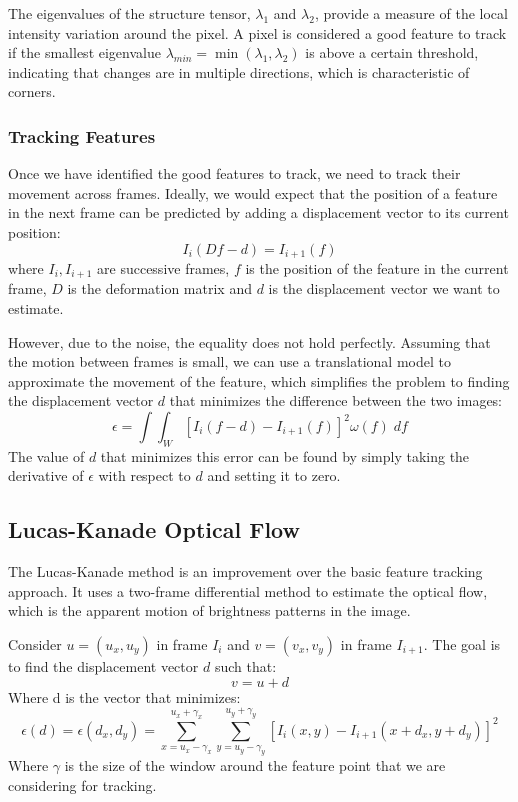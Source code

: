 The eigenvalues of the structure tensor, $\lambda_1$ and $\lambda_2$, provide a measure of the local intensity variation around the pixel.
A pixel is considered a good feature to track if the smallest eigenvalue $\lambda_{min} = \min(\lambda_1, \lambda_2)$ is above a certain threshold, 
indicating that changes are in multiple directions, which is characteristic of corners.

\subsubsection{Tracking Features}
Once we have identified the good features to track, we need to track their movement across frames.
Ideally, we would expect that the position of a feature in the next frame can be predicted by adding a displacement vector to its current position:
$$I_i(Df - d) = I_{i+1}(f)$$
where $I_i, I_{i+1}$ are successive frames, $f$ is the position of the feature in the current frame, $D$ is the deformation matrix 
and $d$ is the displacement vector we want to estimate.

However, due to the noise, the equality does not hold perfectly. Assuming that the motion between frames is small, 
we can use a translational model to approximate the movement of the feature, which simplifies the problem to 
finding the displacement vector $d$ that minimizes the difference between the two images:
$$\epsilon = \int \int_{W} [I_i(f - d) -  I_{i+1}(f)]^2 \omega(f) \; df$$
The value of $d$ that minimizes this error can be found by simply taking the derivative of $\epsilon$ with respect to $d$ and setting it to zero.

\subsection{Lucas-Kanade Optical Flow}
The Lucas-Kanade method is an improvement over the basic feature tracking approach.
It uses a two-frame differential method to estimate the optical flow, which is the apparent motion of brightness patterns in the image.

Consider $u = (u_x, u_y)$ in frame $I_i$ and $v = (v_x, v_y)$ in frame $I_{i+1}$. The goal is to find the displacement vector $d$ such that:
$$v = u + d$$
Where d is the vector that minimizes:
$$\epsilon(d) = \epsilon(d_x, d_y) = \sum_{x = u_x - \gamma_x}^{u_x + \gamma_x} \sum_{y = u_y - \gamma_y}^{u_y + \gamma_y} [I_i(x, y) - I_{i+1}(x + d_x, y + d_y)]^2$$
Where $\gamma$ is the size of the window around the feature point that we are considering for tracking.

